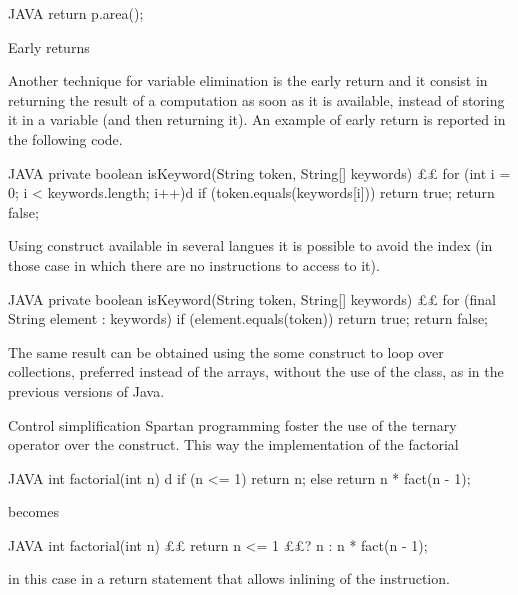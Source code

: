 \begin{description}
\begin{code}{JAVA}
return p.area();
\end{code}

\item{Early returns}

Another technique for variable elimination is the early return and it consist
in returning the result of a computation as soon as it is available, instead of
storing it in a variable (and then returning it). An example of early return
is reported in the following code.

\begin{code}{JAVA}
private boolean isKeyword(String token, String[] keywords) {££
    for (int i = 0; i < keywords.length; i++)d
        if (token.equals(keywords[i]))
            return true;
    return false;
}
\end{code}

Using  construct available in several langues it is possible to
avoid the index (in those case in which there are no instructions to access to
it).
\begin{code}{JAVA}
private boolean isKeyword(String token, String[] keywords) {££
    for (final String element : keywords)
        if (element.equals(token))
            return true;
    return false;
}
\end{code}
The same result can be obtained using the some construct to loop over
collections, preferred instead of the arrays, without the use of the
 class, as in the previous versions of Java.


\item{Control simplification}
Spartan programming foster the use of the ternary operator over the
 construct. This way the implementation of the factorial
\begin{code}{JAVA}
int factorial(int n) {d
    if (n <= 1)
        return n;
    else
        return n * fact(n - 1);
}
\end{code}
becomes
\begin{code}{JAVA}
int factorial(int n) {££
  return n <= 1 ££? n : n * fact(n - 1);
}
\end{code}
in this case in a return statement that allows inlining of the instruction.


\end{description}
